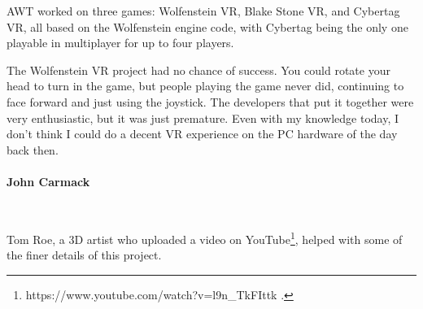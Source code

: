  AWT worked on three games: Wolfenstein VR, Blake Stone VR, and Cybertag VR, all based on the Wolfenstein engine code, with Cybertag being the only one playable in multiplayer for up to four players. \\
\par
\begin{fancyquotes}
The Wolfenstein VR project had no chance of success.  You could rotate your head to turn in the game, but people playing the game never did, continuing to face forward and just using the joystick.  The developers that put it together were very enthusiastic, but it was just premature.  Even with my knowledge today, I don't think I could do a decent VR experience on the PC hardware of the day back then.\\
\bigskip \\
\textbf{John Carmack}
 \end{fancyquotes}\\
\par
Tom Roe, a 3D artist who uploaded a video on YouTube\footnote{https://www.youtube.com/watch?v=l9n\_TkFIttk .}, helped with some of the finer details of this project.
\par


\begin{figure}[H]
  \centering
 
\end{figure}

\begin{figure}[H]
  \centering
{}
 
\end{figure}

\begin{figure}[H]
  \centering
{}
 
\end{figure}

\begin{figure}[H]
  \centering
{}
 
\end{figure}


